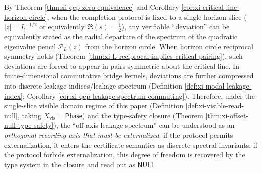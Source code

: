 \begin{remark}\label{rem:xi-qep-leakage-conceptual}
By Theorem \ref{thm:xi-qep-zero-equivalence} and Corollary \ref{cor:xi-critical-line-horizon-circle}, when the completion protocol is fixed to a single horizon slice (\(|z|=L^{-1/2}\) or equivalently \(\Re(s)=\tfrac12\)), any verifiable ``deviation'' can be equivalently stated as the radial departure of the spectrum of the quadratic eigenvalue pencil \(\mathcal{P}_L(z)\) from the horizon circle.
When horizon circle reciprocal symmetry holds (Theorem \ref{thm:xi-L-reciprocal-implies-critical-pairing}), such deviations are forced to appear in pairs symmetric about the critical line.
In finite-dimensional commutative bridge kernels, deviations are further compressed into discrete leakage indices/leakage spectrum (Definition \ref{def:xi-modal-leakage-index}; Corollary \ref{cor:xi-qep-leakage-spectrum-commuting}).
Therefore, under the single-slice visible domain regime of this paper (Definition \ref{def:xi-visible-read-null}, taking \(X_{\mathrm{vis}}=\mathsf{Phase}\)) and the type-safety closure (Theorem \ref{thm:xi-offset-null-type-safety}), the ``off-axis leakage spectrum'' can be understood as an \emph{orthogonal recording axis that must be externalized}: if the protocol permits externalization, it enters the certificate semantics as discrete spectral invariants; if the protocol forbids externalization, this degree of freedom is recovered by the type system in the closure and read out as \(\mathsf{NULL}\).
\end{remark}


\endinput
